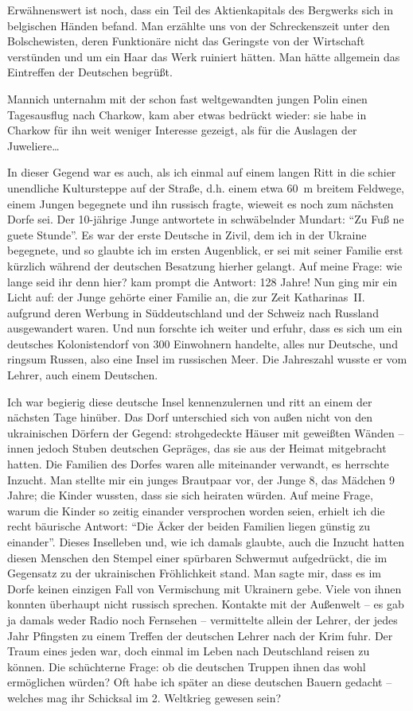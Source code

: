 \documentclass[a5paper,pagesize,10pt,twoside=true]{scrbook}
\begin{document}
Erwähnenswert ist noch, dass ein Teil des Aktienkapitals des Bergwerks sich in belgischen Händen befand. Man erzählte uns von der Schreckenszeit unter den Bolschewisten, deren Funktionäre nicht das Geringste von der Wirtschaft verstünden und um ein Haar das Werk ruiniert hätten. Man hätte allgemein das Eintreffen der Deutschen begrüßt.

Mannich unternahm mit der schon fast weltgewandten jungen Polin einen Tagesausflug nach Charkow, kam aber etwas bedrückt wieder: sie habe in Charkow für ihn weit weniger Interesse gezeigt, als für die Auslagen der Juweliere\dots

In dieser Gegend war es auch, als ich einmal auf einem langen Ritt in die schier unendliche Kultursteppe auf der Straße, d.h. einem etwa 60~m breitem Feldwege, einem Jungen begegnete und ihn russisch fragte, wieweit es noch zum nächsten Dorfe sei. Der 10-jährige Junge antwortete in schwäbelnder Mundart: \enquote{Zu Fuß ne guete Stunde}. Es war der erste Deutsche in Zivil, dem ich in der Ukraine begegnete, und so glaubte ich im ersten Augenblick, er sei mit seiner Familie erst kürzlich während der deutschen Besatzung hierher gelangt. Auf meine Frage: wie lange seid ihr denn hier? kam prompt die Antwort: 128 Jahre! Nun ging mir ein Licht auf: der Junge gehörte einer Familie an, die zur Zeit Katharinas~II. aufgrund deren Werbung in Süddeutschland und der Schweiz nach Russland ausgewandert waren. Und nun forschte ich weiter und erfuhr, dass es sich um ein deutsches Kolonistendorf von 300 Einwohnern handelte, alles nur Deutsche, und ringsum Russen, also eine Insel im russischen Meer. Die Jahreszahl wusste er vom Lehrer, auch einem Deutschen.

Ich war begierig diese deutsche Insel kennenzulernen und ritt an einem der nächsten Tage hinüber. Das Dorf unterschied sich von außen nicht von den ukrainischen Dörfern der Gegend: strohgedeckte Häuser mit geweißten Wänden -- innen jedoch Stuben deutschen Gepräges, das sie aus der Heimat mitgebracht hatten. Die Familien des Dorfes waren alle miteinander verwandt, es herrschte Inzucht. Man stellte mir ein junges Brautpaar vor, der Junge 8, das Mädchen 9 Jahre; die Kinder wussten, dass sie sich heiraten würden. Auf meine Frage, warum die Kinder so zeitig einander versprochen worden seien, erhielt ich die recht bäurische Antwort: \enquote{Die Äcker der beiden Familien liegen günstig zu einander}. Dieses Inselleben und, wie ich damals glaubte, auch die Inzucht hatten diesen Menschen den Stempel einer spürbaren Schwermut aufgedrückt, die im Gegensatz zu der ukrainischen Fröhlichkeit stand. Man sagte mir, dass es im Dorfe keinen einzigen Fall von Vermischung mit Ukrainern gebe. Viele von ihnen konnten überhaupt nicht russisch sprechen. Kontakte mit der Außenwelt -- es gab ja damals weder Radio noch Fernsehen -- vermittelte allein der Lehrer, der jedes Jahr Pfingsten zu einem Treffen der deutschen Lehrer nach der Krim fuhr. Der Traum eines jeden war, doch einmal im Leben nach Deutschland reisen zu können. Die schüchterne Frage: ob die deutschen Truppen ihnen das wohl ermöglichen würden? Oft habe ich später an diese deutschen Bauern gedacht -- welches mag ihr Schicksal im 2. Weltkrieg gewesen sein?
\end{document}
